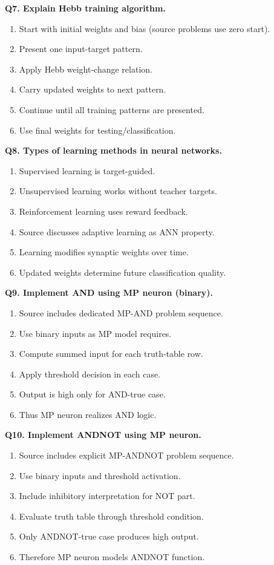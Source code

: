 \documentclass[11pt,a4paper]{article}
\begin{document}
\textbf{Q7. Explain Hebb training algorithm.}
\begin{enumerate}
\item Start with initial weights and bias (source problems use zero start).
\item Present one input-target pattern.
\item Apply Hebb weight-change relation.
\item Carry updated weights to next pattern.
\item Continue until all training patterns are presented.
\item Use final weights for testing/classification.
\end{enumerate}

\textbf{Q8. Types of learning methods in neural networks.}
\begin{enumerate}
\item Supervised learning is target-guided.
\item Unsupervised learning works without teacher targets.
\item Reinforcement learning uses reward feedback.
\item Source discusses adaptive learning as ANN property.
\item Learning modifies synaptic weights over time.
\item Updated weights determine future classification quality.
\end{enumerate}

\textbf{Q9. Implement AND using MP neuron (binary).}
\begin{enumerate}
\item Source includes dedicated MP-AND problem sequence.
\item Use binary inputs as MP model requires.
\item Compute summed input for each truth-table row.
\item Apply threshold decision in each case.
\item Output is high only for AND-true case.
\item Thus MP neuron realizes AND logic.
\end{enumerate}

\textbf{Q10. Implement ANDNOT using MP neuron.}
\begin{enumerate}
\item Source includes explicit MP-ANDNOT problem sequence.
\item Use binary inputs and threshold activation.
\item Include inhibitory interpretation for NOT part.
\item Evaluate truth table through threshold condition.
\item Only ANDNOT-true case produces high output.
\item Therefore MP neuron models ANDNOT function.
\end{enumerate}
\end{document}
